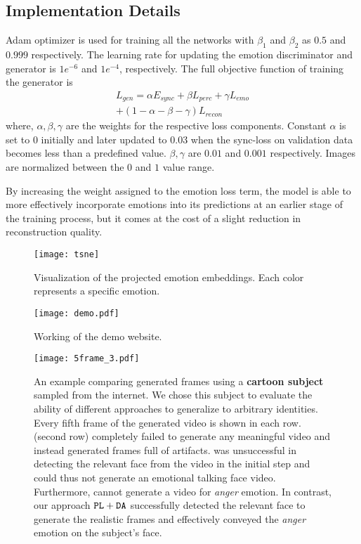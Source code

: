 \documentclass[accepted]{uai2023}
\begin{document}
\subsection{Implementation Details}
Adam optimizer \citep{duchi2011adaptive} is used for training all the networks with $\beta_{1}$ and $\beta_{2}$ as $0.5$ and $0.999$ respectively. The learning rate for updating the emotion discriminator and generator is $1e^{-6}$ and $1e^{-4}$, respectively. The full objective function of training the generator is
\begin{equation}
\begin{split}
    L_{gen} = \alpha E_{sync} + \beta L_{perc} + \gamma L_{emo}\\ + (1-\alpha-\beta-\gamma) L_{recon}
\end{split}
\end{equation}
where, $\alpha, \beta, \gamma$ are the weights for the respective loss components.
Constant $\alpha$ is set to $0$ initially and later updated to $0.03$ when the sync-loss on validation data becomes less than a predefined value. $\beta, \gamma$ are $0.01$ and $0.001$ respectively. Images are normalized between the $0$ and $1$ value range.  

By increasing the weight assigned to the emotion loss term, the model is able to more effectively incorporate emotions into its predictions at an earlier stage of the training process, but it comes at the cost of a slight reduction in reconstruction quality.

 \begin{figure}[htp]
    \centering
    \texttt{[image: tsne]}
    \caption{Visualization of the projected emotion embeddings. Each color represents a specific emotion.}
    \label{fig:tsne}
\end{figure}

\begin{figure}[htp]
\texttt{[image: demo.pdf]}
\caption{Working of the demo website.}
\label{fig:demo}
\end{figure}

\begin{figure*}[htp]
\texttt{[image: 5frame\_3.pdf]}
\caption{An example comparing generated frames using a \textbf{cartoon subject} sampled from the internet. We chose this subject to evaluate the ability of different approaches to generalize to arbitrary identities. Every fifth frame of the generated video is shown in each row. \citet{wang2021audio2head} (second row) completely failed to generate any meaningful video and instead generated frames full of artifacts. \cite{9496264} was unsuccessful in detecting the relevant face from the video in the initial step and could thus not generate an emotional talking face video. Furthermore, \citet{magnusson2021invertable} cannot generate a video for \emph{anger} emotion.
In contrast, our approach {${\tt PL+DA}$} successfully detected the relevant face to generate the realistic frames and effectively conveyed the \emph{anger} emotion on the subject's face.}
\label{fig:cmp2}
\end{figure*}
\end{document}
